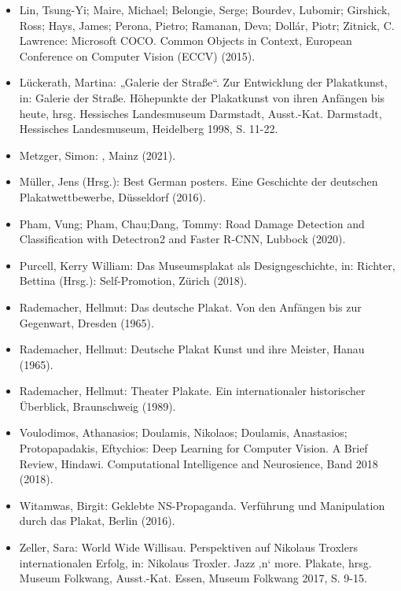 \documentclass[a4paper,12pt,ngerman]{article}
\begin{document}
\begin{itemize}
	\item Lin, Tsung-Yi; Maire, Michael; Belongie, Serge; Bourdev, Lubomir; Girshick, Ross; Hays, James; Perona, Pietro; Ramanan, Deva; Dollár, Piotr; Zitnick, C. Lawrence: Microsoft COCO. Common Objects in Context, European Conference on Computer Vision (ECCV) (2015).
	\item Lückerath, Martina: „Galerie der Straße“. Zur Entwicklung der Plakatkunst, in: Galerie der Straße. Höhepunkte der Plakatkunst von ihren Anfängen bis heute, hrsg. Hessisches Landesmuseum Darmstadt, Ausst.-Kat. Darmstadt, Hessisches Landesmuseum, Heidelberg 1998, S. 11-22.
	\item Metzger, Simon: , Mainz (2021).
	\item Müller, Jens (Hrsg.): Best German posters. Eine Geschichte der deutschen Plakatwettbewerbe, Düsseldorf (2016).
	\item Pham, Vung; Pham, Chau;Dang, Tommy: Road Damage Detection and Classification with Detectron2 and Faster R-CNN, Lubbock (2020). 
	\item Purcell, Kerry William: Das Museumsplakat als Designgeschichte, in: Richter, Bettina (Hrsg.): Self-Promotion, Zürich (2018).
	\item Rademacher, Hellmut: Das deutsche Plakat. Von den Anfängen bis zur Gegenwart, Dresden (1965).
	\item Rademacher, Hellmut: Deutsche Plakat Kunst und ihre Meister, Hanau (1965).
	\item Rademacher, Hellmut: Theater Plakate. Ein internationaler historischer Überblick, Braunschweig (1989).
	\item Voulodimos, Athanasios; Doulamis, Nikolaos; Doulamis, Anastasios; Protopapadakis, Eftychios: Deep Learning for Computer Vision. A Brief Review, Hindawi. Computational Intelligence and Neurosience, Band 2018 (2018). 
	\item Witamwas, Birgit: Geklebte NS-Propaganda. Verführung und Manipulation durch das Plakat, Berlin (2016).
	\item Zeller, Sara: World Wide Willisau. Perspektiven auf Nikolaus Troxlers internationalen Erfolg, in: Nikolaus Troxler. Jazz ‚n‘ more. Plakate, hrsg. Museum Folkwang, Ausst.-Kat. Essen, Museum Folkwang 2017, S. 9-15.

\end{itemize}

\end{document}
